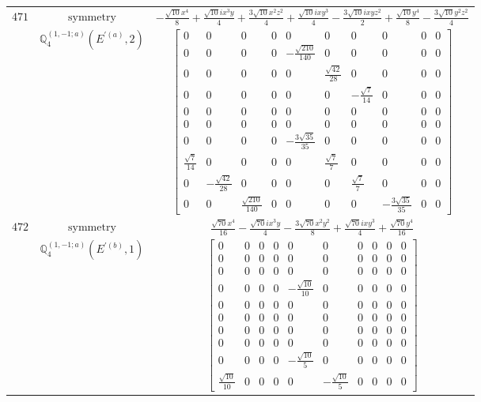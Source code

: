 \documentclass[fleqn,8pt,landscape]{jsarticle}
\begin{document}
\begin{longtable}{ccc}
$ 471 $ & $ \text{symmetry} $ & $ - \frac{\sqrt{10} x^{4}}{8} + \frac{\sqrt{10} i x^{3} y}{4} + \frac{3 \sqrt{10} x^{2} z^{2}}{4} + \frac{\sqrt{10} i x y^{3}}{4} - \frac{3 \sqrt{10} i x y z^{2}}{2} + \frac{\sqrt{10} y^{4}}{8} - \frac{3 \sqrt{10} y^{2} z^{2}}{4} $ \\
$  $ & $ \mathbb{Q}_{4}^{(1,-1;a)}(E^{\prime(a)},2) $ & $ \begin{bmatrix} 0 & 0 & 0 & 0 & 0 & 0 & 0 & 0 & 0 & 0 \\ 0 & 0 & 0 & 0 & - \frac{\sqrt{210}}{140} & 0 & 0 & 0 & 0 & 0 \\ 0 & 0 & 0 & 0 & 0 & \frac{\sqrt{42}}{28} & 0 & 0 & 0 & 0 \\ 0 & 0 & 0 & 0 & 0 & 0 & - \frac{\sqrt{7}}{14} & 0 & 0 & 0 \\ 0 & 0 & 0 & 0 & 0 & 0 & 0 & 0 & 0 & 0 \\ 0 & 0 & 0 & 0 & 0 & 0 & 0 & 0 & 0 & 0 \\ 0 & 0 & 0 & 0 & - \frac{3 \sqrt{35}}{35} & 0 & 0 & 0 & 0 & 0 \\ \frac{\sqrt{7}}{14} & 0 & 0 & 0 & 0 & \frac{\sqrt{7}}{7} & 0 & 0 & 0 & 0 \\ 0 & - \frac{\sqrt{42}}{28} & 0 & 0 & 0 & 0 & \frac{\sqrt{7}}{7} & 0 & 0 & 0 \\ 0 & 0 & \frac{\sqrt{210}}{140} & 0 & 0 & 0 & 0 & - \frac{3 \sqrt{35}}{35} & 0 & 0 \end{bmatrix} $ \\ \hline
$ 472 $ & $ \text{symmetry} $ & $ \frac{\sqrt{70} x^{4}}{16} - \frac{\sqrt{70} i x^{3} y}{4} - \frac{3 \sqrt{70} x^{2} y^{2}}{8} + \frac{\sqrt{70} i x y^{3}}{4} + \frac{\sqrt{70} y^{4}}{16} $ \\
$  $ & $ \mathbb{Q}_{4}^{(1,-1;a)}(E^{\prime(b)},1) $ & $ \begin{bmatrix} 0 & 0 & 0 & 0 & 0 & 0 & 0 & 0 & 0 & 0 \\ 0 & 0 & 0 & 0 & 0 & 0 & 0 & 0 & 0 & 0 \\ 0 & 0 & 0 & 0 & 0 & 0 & 0 & 0 & 0 & 0 \\ 0 & 0 & 0 & 0 & - \frac{\sqrt{10}}{10} & 0 & 0 & 0 & 0 & 0 \\ 0 & 0 & 0 & 0 & 0 & 0 & 0 & 0 & 0 & 0 \\ 0 & 0 & 0 & 0 & 0 & 0 & 0 & 0 & 0 & 0 \\ 0 & 0 & 0 & 0 & 0 & 0 & 0 & 0 & 0 & 0 \\ 0 & 0 & 0 & 0 & 0 & 0 & 0 & 0 & 0 & 0 \\ 0 & 0 & 0 & 0 & - \frac{\sqrt{10}}{5} & 0 & 0 & 0 & 0 & 0 \\ \frac{\sqrt{10}}{10} & 0 & 0 & 0 & 0 & - \frac{\sqrt{10}}{5} & 0 & 0 & 0 & 0 \end{bmatrix} $ \\ \hline

\end{longtable}
\end{document}
